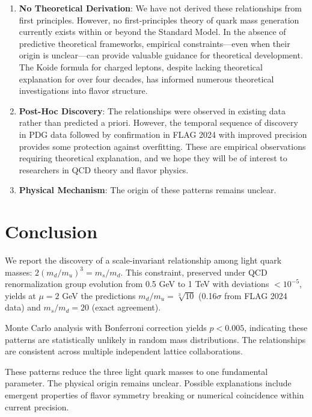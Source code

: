 \documentclass[12pt]{article}
\begin{document}
\begin{enumerate}
\item \textbf{No Theoretical Derivation}: We have not derived these relationships from first principles. However, no first-principles theory of quark mass generation currently exists within or beyond the Standard Model. In the absence of predictive theoretical frameworks, empirical constraints—even when their origin is unclear—can provide valuable guidance for theoretical development. The Koide formula for charged leptons, despite lacking theoretical explanation for over four decades, has informed numerous theoretical investigations into flavor structure.

\item \textbf{Post-Hoc Discovery}: The relationships were observed in existing data rather than predicted a priori. However, the temporal sequence of discovery in PDG data followed by confirmation in FLAG 2024 with improved precision provides some protection against overfitting. These are empirical observations requiring theoretical explanation, and we hope they will be of interest to researchers in QCD theory and flavor physics.

\item \textbf{Physical Mechanism}: The origin of these patterns remains unclear.
\end{enumerate}

\section{Conclusion}

We report the discovery of a scale-invariant relationship among light quark masses: $2(m_d/m_u)^3 = m_s/m_d$. This constraint, preserved under QCD renormalization group evolution from 0.5 GeV to 1 TeV with deviations $<10^{-5}$, yields at $\mu=2$ GeV the predictions $m_d/m_u = \sqrt[3]{10}$ (0.16$\sigma$ from FLAG 2024 data) and $m_s/m_d = 20$ (exact agreement).

Monte Carlo analysis with Bonferroni correction yields $p < 0.005$, indicating these patterns are statistically unlikely in random mass distributions. The relationships are consistent across multiple independent lattice collaborations.

These patterns reduce the three light quark masses to one fundamental parameter. The physical origin remains unclear. Possible explanations include emergent properties of flavor symmetry breaking or numerical coincidence within current precision.
\end{document}
